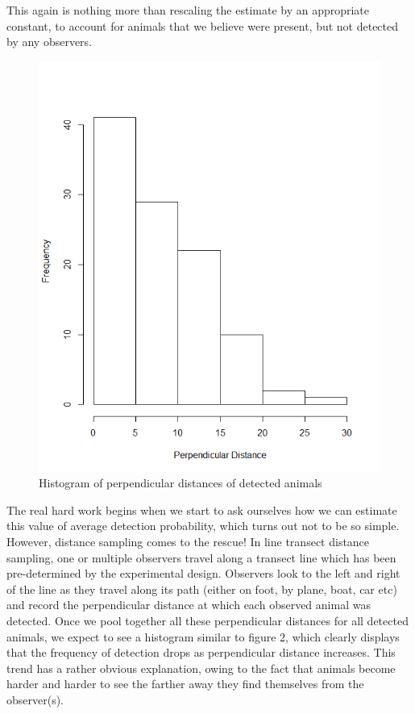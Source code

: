 \documentclass[11pt]{article}
\begin{document}
\begin{multicols}{2}
This again is nothing more than rescaling the estimate by an appropriate constant, to account for animals that we believe were present, but not detected by any observers. 
\begin{figure}[H]
\includegraphics[scale=0.5]{DistanceHist}
\caption{Histogram of perpendicular distances of detected animals}
\end{figure}

The real hard work begins when we start to ask ourselves how we can estimate this value of average detection probability, which turns out not to be so simple. However, distance sampling comes to the rescue!  In line transect distance sampling, one or multiple observers travel along a transect line which has been pre-determined by the experimental design. Observers look to the left and right of the line as they travel along its path (either on foot, by plane, boat, car etc) and record the perpendicular distance at which each observed animal was detected. Once we pool together all these perpendicular distances for all detected animals, we expect to see a histogram similar to figure 2, which clearly displays that the frequency of detection drops as perpendicular distance increases. This trend has a rather obvious explanation, owing to the fact that animals become harder and harder to see the farther away they find themselves from the observer(s).




\end{multicols}
\end{document}

